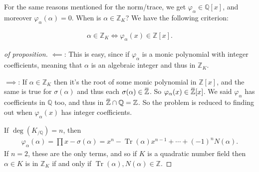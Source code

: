 \begin{remark}

For the same reasons mentioned for the norm/trace, we get
\(\varphi_{\alpha} \in {\mathbb{Q}}[x]\), and moreover
\(\varphi_{ \alpha } (\alpha) = 0\). When is
\(\alpha\in {\mathbb{Z}}_K\)? We have the following criterion:

\end{remark}

\begin{proposition}

\begin{align*}
\alpha\in {\mathbb{Z}}_K \iff \varphi_{ \alpha } (x) \in {\mathbb{Z}}[x]
.\end{align*}

\end{proposition}

\begin{proof}[of proposition]

\(\impliedby\): This is easy, since if \(\varphi_\alpha\) is a monic
polynomial with integer coefficients, meaning that \(\alpha\) is an
algebraic integer and thus in \({\mathbb{Z}}_K\).

\hfill\break

\(\implies\): If \(\alpha \in {\mathbb{Z}}_K\) then it's the root of
some monic polynomial in \({\mathbb{Z}}[x]\), and the same is true for
\(\sigma(\alpha)\) and thus each
\(\sigma(\alpha) \in \mkern 1.5mu\overline{\mkern-1.5mu{\mathbb{Z}}\mkern-1.5mu}\mkern 1.5mu\).
So
\(\varphi_{ \alpha}(x) \in \mkern 1.5mu\overline{\mkern-1.5mu{\mathbb{Z}}\mkern-1.5mu}\mkern 1.5mu[x]\).
We said \(\varphi_{ \alpha}\) has coefficients in \({\mathbb{Q}}\) too,
and thus in
\(\mkern 1.5mu\overline{\mkern-1.5mu{\mathbb{Z}}\mkern-1.5mu}\mkern 1.5mu\cap{\mathbb{Q}}= {\mathbb{Z}}\).
So the problem is reduced to finding out when \(\varphi_{\alpha}(x)\)
has integer coefficients.

If \(\deg(K_{/{\mathbb{Q}}}) = n\), then
\begin{align*}
\varphi_{ \alpha}( \alpha) = \prod x- \sigma(\alpha) = x^n - \operatorname{Tr}(\alpha)x^{n-1} + \cdots + (-1)^n N( \alpha)
.\end{align*}
If \(n=2\), these are the only terms, and so if \(K\) is a quadratic
number field then \(\alpha\in K\) is in \({\mathbb{Z}}_K\) if and only
if \(\operatorname{Tr}( \alpha), N(\alpha) \in {\mathbb{Z}}\).

\end{proof}

